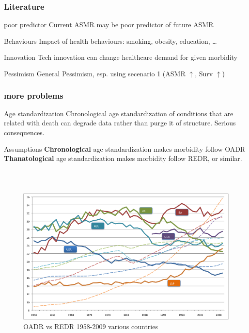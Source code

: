 \documentclass[20pt]{beamer}
\begin{document}
\begin{frame}%
\frametitle{Literature}

\begin{block}{poor predictor}
Current ASMR may be poor predictor of future ASMR
\end{block}

\begin{block}{Behaviours}
Impact of health behaviours: smoking, obesity, education, \ldots
\end{block}

\begin{block}{Innovation}
Tech innovation can change healthcare demand for given morbidity
\end{block}

\begin{block}{Pessimism}
General Pessimism, esp. using secenario 1 (ASMR $\uparrow$, Surv $\uparrow$)
\end{block}
\end{frame}	%
%
\begin{frame}
\frametitle{more problems}
\begin{block}{Age standardization}
Chronological age standardization of conditions that are related with death can
degrade data rather than purge it of structure. Serious consequences.
\end{block}
\begin{block}{Assumptions}
\textbf{Chronological} age standardization makes morbidity follow OADR
\textbf{Thanatological} age standardization makes morbidity follow REDR, or
similar.\footnotemark
\end{block}
%
\end{frame}

\begin{frame}

\begin{figure}[b]
\frametitle{~}
    \centering
    \caption{OADR vs REDR 1958-2009 various countries}
    \includegraphics[scale=.9]{Figures/Johnsfig.png}
\end{figure} 
\end{frame}
\end{document}
